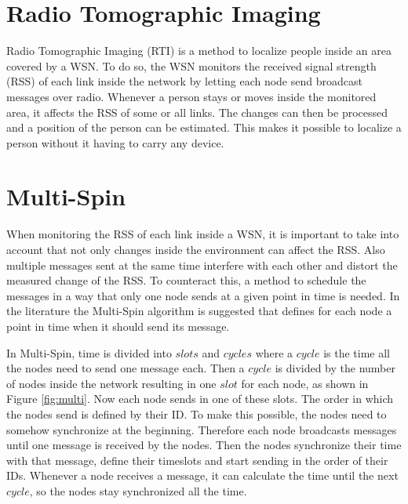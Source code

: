 

\section{Radio Tomographic Imaging}
Radio Tomographic Imaging (RTI) is a method to localize people inside an area covered by a WSN. To do so, the WSN monitors the received signal strength (RSS) of each link inside the network by letting each node send broadcast messages over radio. Whenever a person stays or moves inside the monitored area, it affects the RSS of some or all links. The changes can then be processed and a position of the person can be estimated. This makes it possible to localize a person without it having to carry any device.  \cite{RTI}\cite{RtiMulti}
\section{Multi-Spin}
When monitoring the RSS of each link inside a WSN, it is important to take into account that not only changes inside the environment can affect the RSS. Also multiple messages sent at the same time interfere with each other and distort the measured change of the RSS. To counteract this, a method to schedule the messages in a way that only one node sends at a given point in time is needed. In the literature the Multi-Spin \cite{RtiMulti} algorithm is suggested that defines for each node a point in time when it should send its message.

In Multi-Spin, time is divided into $slots$ and $cycles$ where a $cycle$ is the time all the nodes need to send one message each. Then a $cycle$ is divided by the number of nodes inside the network resulting in one $slot$ for each node, as shown in Figure \ref{fig:multi}. Now each node sends in one of these slots. The order in which the nodes send is defined by their ID. To make this possible, the nodes need to somehow synchronize at the beginning. Therefore each node broadcasts messages until one message is received by the nodes. Then the nodes synchronize their time with that message, define their timeslots and start sending in the order of their IDs. Whenever a node receives a message, it can calculate the time until the next $cycle$, so the nodes stay synchronized all the time. \cite{RtiMulti}

